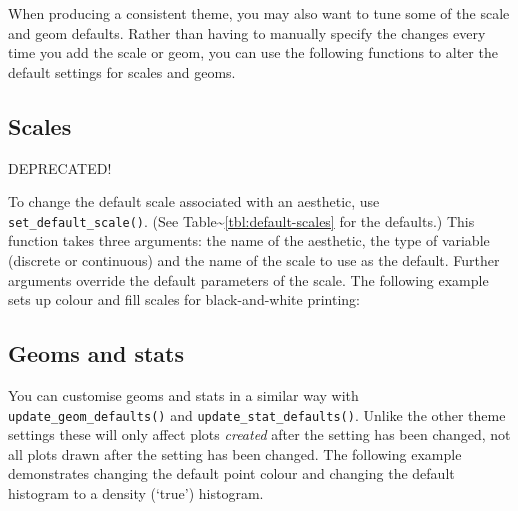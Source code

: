 
When producing a consistent theme, you may also want to tune some of the
scale and geom defaults. Rather than having to manually specify the
changes every time you add the scale or geom, you can use the following
functions to alter the default settings for scales and geoms.

\subsection{Scales}\label{sub:customise-scales}

DEPRECATED!

To change the default scale associated with an aesthetic, use
\texttt{set\_default\_scale()}. (See
Table\textasciitilde{}\ref{tbl:default-scales} for the defaults.) This
function takes three arguments: the name of the aesthetic, the type of
variable (discrete or continuous) and the name of the scale to use as
the default. Further arguments override the default parameters of the
scale. The following example sets up colour and fill scales for
black-and-white printing: 

\subsection{Geoms and stats}\label{sub:geoms-and-stats}

You can customise geoms and stats in a similar way with
\texttt{update\_geom\_defaults()} and \texttt{update\_stat\_defaults()}.
Unlike the other theme settings these will only affect plots
\emph{created} after the setting has been changed, not all plots drawn
after the setting has been changed. The following example demonstrates
changing the default point colour and changing the default histogram to
a density (`true') histogram. 
 

\begin{Shaded}
\begin{Highlighting}[]
\NormalTok{(}\NormalTok{, }\NormalTok{(} \NormalTok{))}
 
\NormalTok{(}\NormalTok{, }\NormalTok{(} 
  \NormalTok{, } \NormalTok{)}
\end{Highlighting}
\end{Shaded}

